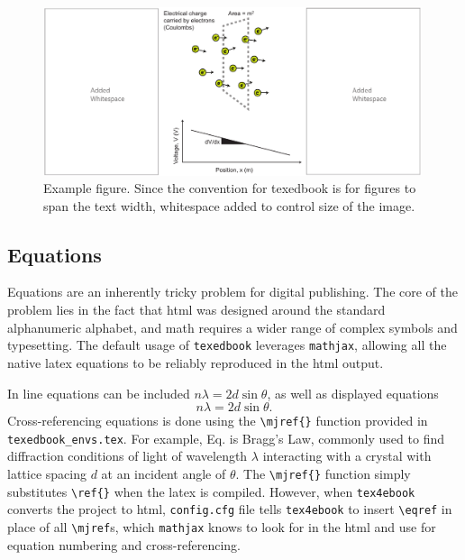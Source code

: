 \documentclass{article}
\begin{document}
\begin{figure}[t]
    \centering
    \includegraphics[width=0.99\textwidth, keepaspectratio]{figures/fig.pdf}
    \caption{Example figure. Since the convention for texedbook is for figures to span the text width, whitespace added to control size of the image.}
    \label{fig:example}
\end{figure}



\subsection{Equations} \label{sec:equations}
Equations are an inherently tricky problem for digital publishing. The core of the problem lies in the fact that html was designed around the standard alphanumeric alphabet, and math requires a wider range of complex symbols and typesetting. The default usage of \verb'texedbook' leverages \verb'mathjax', allowing all the native latex equations to be reliably reproduced in the html output.

In line equations can be included $n\lambda=2d \sin \theta$, as well as displayed equations 
\begin{equation}
    n\lambda=2d \sin \theta.
    \label{eq:braggslaw}
\end{equation}
Cross-referencing equations is done using the \verb'\mjref{}' function provided in \verb'texedbook_envs.tex'. For example, Eq.  is Bragg's Law, commonly used to find diffraction conditions of light of wavelength $\lambda$ interacting with a crystal with lattice spacing $d$ at an incident angle of $\theta$. The \verb'\mjref{}' function simply substitutes \verb'\ref{}' when the latex is compiled. However, when \verb'tex4ebook' converts the project to html, \verb'config.cfg' file tells \verb'tex4ebook' to insert \verb'\eqref' in place of all \verb'\mjref's, which \verb'mathjax' knows to look for in the html and use for equation numbering and cross-referencing. 
\end{document}
